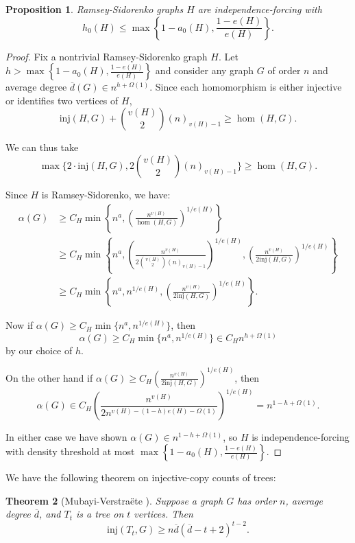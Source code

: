 \documentclass[12pt]{article}
\newtheorem{theorem}{Theorem}
\newtheorem{proposition}[theorem]{Proposition}
\newcommand{\inj}{\mathrm{inj}}
\begin{document}
\begin{proposition}
    Ramsey-Sidorenko graphs $H$ are independence-forcing with 
    \[
    h_0(H)\leq\max\left\{1-a_0(H),\frac{1-e(H)}{e(H)}\right\}.
    \]
\end{proposition}
\begin{proof}
Fix a nontrivial Ramsey-Sidorenko graph $H$. Let $h>\max\left\{1-a_0(H),\frac{1-e(H)}{e(H)}\right\}$ and consider any graph $G$ of order $n$ and average degree $\overline d(G)\in n^{h+\Omega(1)}$. 
Since each homomorphism is either injective or identifies two vertices of $H$,
\[
\inj(H,G)+\binom{v(H)}2(n)_{v(H)-1}\geq\hom(H,G).
\]
    
We can thus take
\[
\max\{2\cdot \inj(H,G),2\binom{v(H)}2(n)_{v(H)-1}\}\geq\hom(H,G).
\]

Since $H$ is Ramsey-Sidorenko, we have:
\begin{align*}
    \alpha(G)&\geq C_H\min\left\{n^{a},\left(\frac{n^{v(H)}}{\hom(H,G)}\right)^{1/e(H)}\right\}\\
    &\geq C_H\min\left\{n^a,\left(\frac{n^{v(H)}}{2\binom{v(H)}2(n)_{v(H)-1}}\right)^{1/e(H)},\left(\frac{n^{v(H)}}{2\inj(H,G)}\right)^{1/e(H)}\right\}\\
    &\geq C_H\min\left\{n^a,n^{1/e(H)},\left(\frac{n^{v(H)}}{2\inj(H,G)}\right)^{1/e(H)}\right\}.
\end{align*}

Now if $\alpha(G)\geq C_H \min\{n^a,n^{1/e(H)}\}$, then
\[
\alpha(G)\geq C_H\min\{n^a,n^{1/e(H)}\}\in C_H n^{h+\Omega(1)}
\]
by our choice of $h$. 

On the other hand if $\alpha(G)\geq C_H\left(\frac{n^{v(H)}}{2\inj(H,G)}\right)^{1/e(H)}$, then
\[
\alpha(G)\in C_H\left(\frac{n^{v(H)}}{2n^{v(H)-(1-h)e(H)-\Omega(1)}}\right)^{1/e(H)}=n^{1-h+\Omega(1)}.
\]

In either case we have shown $\alpha(G)\in n^{1-h+\Omega(1)}$, so $H$ is independence-forcing with density threshold at most $\max\left\{1-a_0(H),\frac{1-e(H)}{e(H)}\right\}$.

\end{proof}



\noindent We have the following theorem on injective-copy counts of trees:

\begin{theorem}[Mubayi-Verstra\"ete \cite{mubayi2015trees}]
\label{thm: trees-density}
    Suppose a graph $G$ has order $n$, average degree $\overline d$, and $T_t$ is a tree on $t$ vertices. Then
$$\inj(T_t,G)\geq n\overline d(\overline d-t+2)^{t-2}.$$
\end{theorem}
\end{document}
